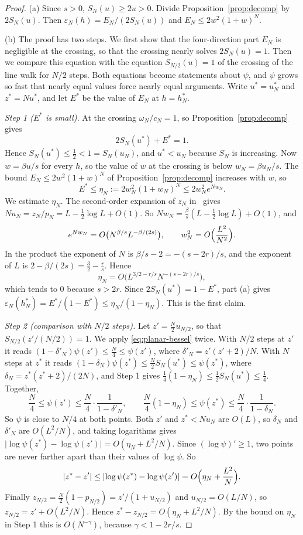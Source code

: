 \begin{proof}
(a) Since $s>0$, $S_N(u)\ge2u>0$. Divide Proposition~\ref{prop:decomp} by $2S_N(u)$. Then
$\varepsilon_N(h)=E_N/(2S_N(u))$ and $E_N\le2w^2(1+w)^N$.

(b) The proof has two steps. We first show that the four-direction part $E_N$ is negligible at the
crossing, so that the crossing nearly solves $2S_N(u)=1$. Then we compare this equation with the
equation $S_{N/2}(u)=1$ of the crossing of the line walk for $N/2$ steps. Both equations become statements about
$\psi$, and $\psi$ grows so fast that nearly equal values force nearly equal arguments. Write
$u^*=u^*_N$ and $z^*=Nu^*$, and let $E^*$ be the value of $E_N$ at $h=h^*_N$.

\emph{Step 1 ($E^*$ is small).} At the crossing $\omega_N/c_N=1$, so Proposition~\ref{prop:decomp} gives
\[
 2S_N(u^*)+E^*=1.
\]
Hence $S_N(u^*)\le\frac12<1=S_N(u_N)$, and $u^*<u_N$ because $S_N$ is increasing. Now
$w=\beta u/s$ for every $h$, so the value of $w$ at the crossing is below $w_N=\beta u_N/s$. The
bound $E_N\le2w^2(1+w)^N$ of Proposition~\ref{prop:decomp} increases with $w$, so
\[
 E^*\le\eta_N:=2w_N^2(1+w_N)^N\le2w_N^2e^{Nw_N}.
\]
We estimate $\eta_N$. The second-order expansion of $z_N$
in~\cite[Corollary~3.7(b)]{paperA} gives $Nu_N=z_N/p_N=L-\frac12\log L+O(1)$. So
$Nw_N=\frac\beta s(L-\frac12\log L)+O(1)$, and
\[
 e^{Nw_N}=O\bigl(N^{\beta/s}L^{-\beta/(2s)}\bigr),\qquad w_N^2=O\Bigl(\frac{L^2}{N^2}\Bigr).
\]
In the product the exponent of $N$ is $\beta/s-2=-(s-2r)/s$, and the exponent of $L$ is
$2-\beta/(2s)=\frac32-\frac rs$. Hence
\[
 \eta_N=O\bigl(L^{3/2-r/s}N^{-(s-2r)/s}\bigr),
\]
which tends to $0$ because $s>2r$. Since $2S_N(u^*)=1-E^*$, part (a) gives
$\varepsilon_N(h^*_N)=E^*/(1-E^*)\le\eta_N/(1-\eta_N)$. This is the first claim.

\emph{Step 2 (comparison with $N/2$ steps).} Let $z'=\frac N2u_{N/2}$, so that
$S_{N/2}(z'/(N/2))=1$. We apply \eqref{eq:planar-bessel} twice. With $N/2$ steps at $z'$ it reads
$(1-\delta'_N)\psi(z')\le\frac N4\le\psi(z')$, where $\delta'_N=z'(z'+2)/N$. With $N$ steps at $z^*$
it reads $(1-\delta_N)\psi(z^*)\le\frac N2S_N(u^*)\le\psi(z^*)$, where
$\delta_N=z^*(z^*+2)/(2N)$, and Step 1 gives $\frac14(1-\eta_N)\le\frac12S_N(u^*)\le\frac14$.
Together,
\[
 \frac N4\le\psi(z')\le\frac N4\cdot\frac1{1-\delta'_N},\qquad
 \frac N4(1-\eta_N)\le\psi(z^*)\le\frac N4\cdot\frac1{1-\delta_N}.
\]
So $\psi$ is close to $N/4$ at both points. Both $z'$ and $z^*<Nu_N$ are $O(L)$, so $\delta_N$ and
$\delta'_N$ are $O(L^2/N)$, and taking logarithms gives
$\lvert\log\psi(z^*)-\log\psi(z')\rvert=O(\eta_N+L^2/N)$. Since $(\log\psi)'\ge1$, two points are
never farther apart than their values of $\log\psi$. So
\[
 \lvert z^*-z'\rvert\le\lvert\log\psi(z^*)-\log\psi(z')\rvert=O\Bigl(\eta_N+\frac{L^2}N\Bigr).
\]
Finally $z_{N/2}=\frac N2(1-p_{N/2})=z'/(1+u_{N/2})$ and $u_{N/2}=O(L/N)$, so
$z_{N/2}=z'+O(L^2/N)$. Hence $z^*-z_{N/2}=O(\eta_N+L^2/N)$. By the bound on $\eta_N$ in Step 1
this is $O(N^{-\gamma})$, because $\gamma<1-2r/s$.


\end{proof}
